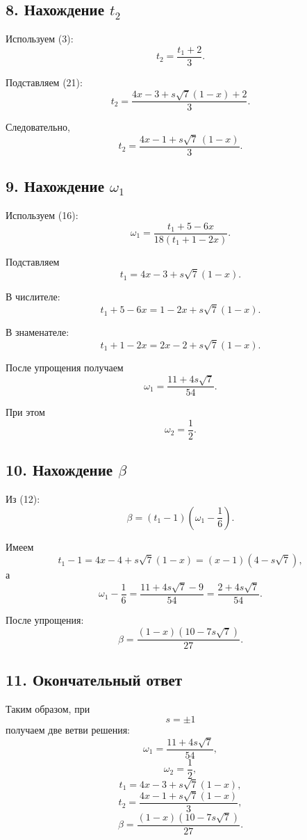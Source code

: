 \documentclass[12pt,a4paper]{article}
\begin{document}
		\subsection*{8. Нахождение $t_2$}
		
		Используем (3):
		\[
		t_2=\frac{t_1+2}{3}.
		\]
		
		Подставляем (21):
		\[
		t_2
		=
		\frac{
			4x-3+s\sqrt{7}(1-x)+2
		}{3}.
		\]
		
		Следовательно,
		\[
		\boxed{
			t_2
			=
			\frac{
				4x-1+s\sqrt{7}\,(1-x)
			}{3}
		}.
		\tag{22}
		\]
		
		\subsection*{9. Нахождение $\omega_1$}
		
		Используем (16):
		\[
		\omega_1
		=
		\frac{t_1+5-6x}
		{18(t_1+1-2x)}.
		\]
		
		Подставляем
		\[
		t_1=4x-3+s\sqrt{7}(1-x).
		\]
		
		В числителе:
		\[
		t_1+5-6x
		=
		1-2x+s\sqrt{7}(1-x).
		\]
		
		В знаменателе:
		\[
		t_1+1-2x
		=
		2x-2+s\sqrt{7}(1-x).
		\]
		
		После упрощения получаем
		\[
		\boxed{
			\omega_1
			=
			\frac{11+4s\sqrt{7}}{54}
		}.
		\tag{23}
		\]
		
		При этом
		\[
		\boxed{
			\omega_2=\frac12
		}.
		\tag{24}
		\]
		
		\subsection*{10. Нахождение $\beta$}
		
		Из (12):
		\[
		\beta
		=
		(t_1-1)
		\left(
		\omega_1-\frac16
		\right).
		\]
		
		Имеем
		\[
		t_1-1
		=
		4x-4+s\sqrt{7}(1-x)
		=
		(x-1)(4-s\sqrt{7}),
		\]
		а
		\[
		\omega_1-\frac16
		=
		\frac{11+4s\sqrt{7}-9}{54}
		=
		\frac{2+4s\sqrt{7}}{54}.
		\]
		
		После упрощения:
		\[
		\boxed{
			\beta
			=
			\frac{(1-x)(10-7s\sqrt{7})}{27}
		}.
		\tag{25}
		\]
		
		\subsection*{11. Окончательный ответ}
		
		Таким образом, при
		\[
		s=\pm1
		\]
		получаем две ветви решения:
		\[
		\boxed{
			\omega_1=
			\frac{11+4s\sqrt{7}}{54}
		},
		\]
		\[
		\boxed{
			\omega_2=\frac12
		},
		\]
		\[
		\boxed{
			t_1=
			4x-3+s\sqrt{7}(1-x)
		},
		\]
		\[
		\boxed{
			t_2=
			\frac{4x-1+s\sqrt{7}(1-x)}{3}
		},
		\]
		\[
		\boxed{
			\beta=
			\frac{(1-x)(10-7s\sqrt{7})}{27}
		}.
		\]
		
\end{document}
